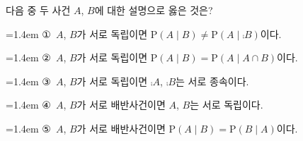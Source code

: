 다음 중 두 사건 $A$, $B$에 대한 설명으로 옳은 것은? 
\par\medskip\par\noindent\hangindent=1.4em {\small ①}\ $A$, $B$가 서로 독립이면 $\mathrm{P}(A\mid B)\ne\mathrm{P}(A\mid\comp{B})$이다.\par\noindent\hangindent=1.4em {\small ②}\ $A$, $B$가 서로 독립이면 $\mathrm{P}(A\mid B)=\mathrm{P}(A\mid A\cap B)$이다.\par\noindent\hangindent=1.4em {\small ③}\ $A$, $B$가 서로 독립이면 $\comp{A}$, $\comp{B}$는 서로 종속이다.\par\noindent\hangindent=1.4em {\small ④}\ $A$, $B$가 서로 배반사건이면 $A$, $B$는 서로 독립이다.\par\noindent\hangindent=1.4em {\small ⑤}\ $A$, $B$가 서로 배반사건이면 $\mathrm{P}(A\mid B)=\mathrm{P}(B\mid A)$이다.\par\medskip
